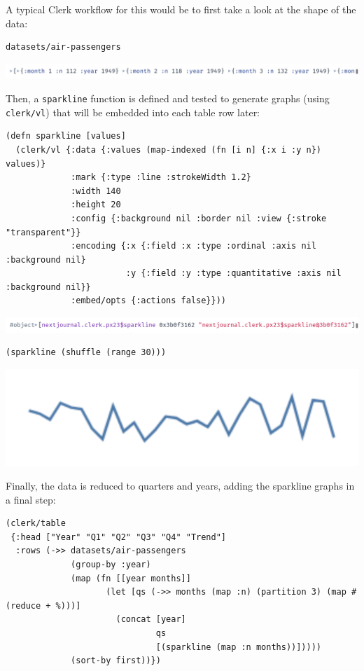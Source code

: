 \documentclass[sigconf,screen]{acmart}
\newcommand{\passthrough}[1]{#1}
\begin{document}
A typical Clerk workflow for this would be to first take a look at the shape of the data:

\begin{lstlisting}
datasets/air-passengers
\end{lstlisting}

\includegraphics{images/anon-expr-5drcDeJRcpX2uPqZi7XJch2DedHM6j-result.png}

Then, a \passthrough{\lstinline!sparkline!} function is defined and tested to generate graphs (using \passthrough{\lstinline!clerk/vl!}) that will be embedded into each table row later:

\begin{lstlisting}
(defn sparkline [values]
  (clerk/vl {:data {:values (map-indexed (fn [i n] {:x i :y n}) values)}
             :mark {:type :line :strokeWidth 1.2}
             :width 140
             :height 20
             :config {:background nil :border nil :view {:stroke "transparent"}}
             :encoding {:x {:field :x :type :ordinal :axis nil :background nil}
                        :y {:field :y :type :quantitative :axis nil :background nil}}
             :embed/opts {:actions false}}))
\end{lstlisting}

\includegraphics{images/sparkline-result.png}

\begin{lstlisting}
(sparkline (shuffle (range 30)))
\end{lstlisting}

\includegraphics{images/anon-expr-5dr3uWTA777Ny4ajSWGaWCymacQXhQ-result.png}

Finally, the data is reduced to quarters and years, adding the sparkline graphs in a final step:

\begin{lstlisting}
(clerk/table
 {:head ["Year" "Q1" "Q2" "Q3" "Q4" "Trend"]
  :rows (->> datasets/air-passengers
             (group-by :year)
             (map (fn [[year months]]
                    (let [qs (->> months (map :n) (partition 3) (map #(reduce + %)))]
                      (concat [year] 
                              qs 
                              [(sparkline (map :n months))]))))
             (sort-by first))})
\end{lstlisting}
\end{document}
